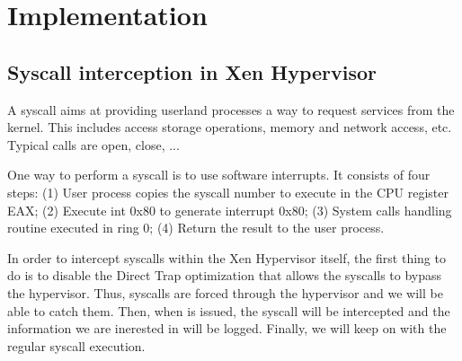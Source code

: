  \section{Implementation} \label{sec:impl}

\subsection{Syscall interception in Xen Hypervisor}\label{sec:interception}

A syscall aims at providing userland processes a way to request services 
from the kernel. This includes access storage operations, memory and network 
access, etc. Typical calls are open, close, \recv... 

One way to perform a syscall is to use software interrupts. It consists of 
four steps: (1) User process copies the syscall number to execute in the CPU register 
EAX; (2) Execute int 0x80 to generate interrupt 0x80; (3) System calls handling 
routine executed in ring 0; (4) Return the result to the user process.

In order to intercept syscalls within the Xen Hypervisor itself, the first thing to do 
is to disable the Direct Trap optimization that allows the syscalls to bypass the 
hypervisor. Thus, syscalls are forced through the hypervisor and we will be able to 
catch them.  Then, when is issued, the syscall will be intercepted and the information 
we are inerested in will be logged. Finally, we will keep on with the regular syscall 
execution.
